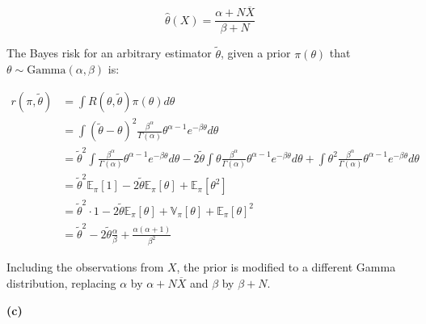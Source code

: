 \[ \hat{\theta}(X) = \frac{\alpha + N \overline{X}}{\beta + N} \]

The Bayes risk for an arbitrary estimator \(\tilde{\theta}\), given a
prior \(\pi(\theta)\) that \(\theta \sim \text{Gamma}(\alpha, \beta)\)
is:

\begin{align*}
r(\pi, \tilde{\theta}) &= \int R(\theta, \tilde{\theta})\pi(\theta) d\theta \\
&= \int (\tilde{\theta} - \theta)^{2} \frac{\beta^\alpha}{\Gamma(\alpha)} \theta^{\alpha - 1}e^{-\beta \theta} d\theta \\
&= \tilde{\theta}^{2} \int \frac{\beta^\alpha}{\Gamma(\alpha)} \theta^{\alpha - 1}e^{-\beta \theta} d\theta
- 2 \tilde{\theta} \int \theta \frac{\beta^\alpha}{\Gamma(\alpha)} \theta^{\alpha - 1}e^{-\beta \theta} d\theta
+ \int \theta^{2}\frac{\beta^\alpha}{\Gamma(\alpha)} \theta^{\alpha - 1}e^{-\beta \theta} d\theta \\
&= \tilde{\theta}^{2} \mathbb{E}_\pi[1] - 2 \tilde{\theta} \mathbb{E}_\pi[\theta] + \mathbb{E}_\pi[\theta^{2}] \\
&= \tilde{\theta}^{2} \cdot 1 - 2 \tilde{\theta} \mathbb{E}_\pi[\theta] + \mathbb{V}_\pi[\theta] + \mathbb{E}_\pi[\theta]^{2} \\
&= \tilde{\theta}^{2} - 2 \tilde{\theta} \frac{\alpha}{\beta} + \frac{\alpha(\alpha + 1)}{\beta^{2}}
\end{align*}

Including the observations from \(X\), the prior is modified to a
different Gamma distribution, replacing \(\alpha\) by
\(\alpha + N \overline{X}\) and \(\beta\) by \(\beta + N\).

\textbf{(c)}

